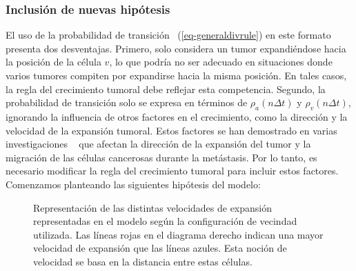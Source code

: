 \subsubsection{Inclusi\'on de nuevas hip\'otesis}
El uso de la probabilidad de transición ~(\ref{eq-generaldivrule}) en este formato presenta dos desventajas. Primero, solo considera un tumor expandiéndose hacia la posición de la célula $v$, lo que podría no ser adecuado en situaciones donde varios tumores compiten por expandirse hacia la misma posición. En tales casos, la regla del crecimiento tumoral debe reflejar esta competencia. Segundo, la probabilidad de transición solo se expresa en términos de $\rho_a(n\Delta t)$ y $\rho_v(n\Delta t)$, ignorando la influencia de otros factores en el crecimiento, como la dirección y la velocidad de la expansión tumoral. Estos factores se han demostrado en varias investigaciones ~\cite{kansal3} que afectan la dirección de la expansión del tumor y la migración de las células cancerosas durante la metástasis. Por lo tanto, es necesario modificar la regla del crecimiento tumoral para incluir estos factores. Comenzamos planteando las siguientes hip\'otesis del modelo:
\begin{figure}[!ht]
\begin{center}
\end{center}\vspace*{-0.6cm}
\caption[Representaci\'on de las distintas velocidades de expansi\'on representadas en el modelo seg\'un la configuraci\'on de vecindad utilizada]{Representaci\'on de las distintas velocidades de expansi\'on representadas en el modelo seg\'un la configuraci\'on de vecindad utilizada. Las l\'ineas rojas en el diagrama derecho indican una mayor velocidad de expansi\'on que las l\'ineas azules. Esta noci\'on de velocidad se basa en la distancia entre estas c\'elulas.}
\label{fig-expansion-velocity}
\end{figure}

